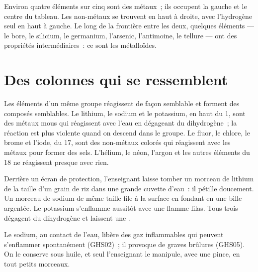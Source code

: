 \begin{proposition}\label{prop:g9:periodic-table-first-look:where}
Environ quatre éléments sur cinq sont des métaux~; ils occupent la
gauche et le centre du tableau. Les non-métaux se trouvent en haut à
droite, avec l'hydrogène seul en haut à gauche. Le long de la frontière
entre les deux, quelques éléments --- le bore, le silicium, le
germanium, l'arsenic, l'antimoine, le tellure --- ont des propriétés
intermédiaires~: ce sont les métalloïdes.
\end{proposition}

\section{Des colonnes qui se ressemblent}

\begin{proposition}\label{prop:g9:periodic-table-first-look:alike}
Les éléments d'un même groupe réagissent de façon semblable et forment
des composés semblables. Le lithium, le sodium et le potassium, en haut
du  1, sont des métaux mous qui réagissent avec l'eau en dégageant
du dihydrogène~; la réaction est plus violente quand on descend dans le
groupe. Le fluor, le chlore, le brome et l'iode, du  17, sont des
non-métaux colorés qui réagissent avec les métaux pour former des sels.
L'hélium, le néon, l'argon et les autres éléments du  18 ne
réagissent presque avec rien.
\end{proposition}

\begin{inthelab}
Derrière un écran de protection, l'enseignant laisse tomber un morceau
de lithium de la taille d'un grain de riz dans une grande cuvette d'eau~:
il pétille doucement. Un morceau de sodium de même taille file à la
surface en fondant en une bille argentée. Le potassium s'enflamme
aussitôt avec une flamme lilas. Tous trois dégagent du dihydrogène et
laissent une .
\end{inthelab}

\begin{safety}{}
Le sodium, au contact de l'eau, libère des gaz inflammables qui peuvent
s'enflammer spontanément (GHS02)~; il provoque de graves brûlures
(GHS05). On le conserve sous huile, et seul l'enseignant le manipule,
avec une pince, en tout petits morceaux.
\end{safety}

